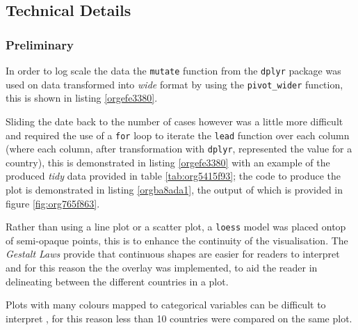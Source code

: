 \documentclass[11pt]{article}
\begin{document}
\subsection{Technical Details}
\label{sec:orgdeb17d1}
\subsubsection{Preliminary}
\label{sec:org9706ce9}
In order to log scale the data the \texttt{mutate} function from the \texttt{dplyr} package
was used on data transformed into \emph{wide} format by using the \texttt{pivot\_wider}
function, this is shown in listing \ref{orgefe3380}.

Sliding the date back to the number of cases however was a little more difficult
and required the use of a \texttt{for} loop to iterate the \texttt{lead} function over each
column (where each column, after transformation with \texttt{dplyr}, represented the
value for a country), this is demonstrated in listing \ref{orgefe3380} with an example of the
produced \emph{tidy} data provided in table \ref{tab:org5415f93}; the code to produce the plot is
demonstrated in listing \ref{orgba8ada1}, the output of which is provided in figure \ref{fig:org765f863}.

Rather than using a line plot or a scatter plot, a \texttt{loess} model was placed ontop of semi-opaque points, this is to enhance the continuity of the visualisation. The \emph{Gestalt Laws} provide that continuous shapes are easier for readers to interpret \cite{staudinger2011} and for this reason the the overlay was implemented, to aid the reader in delineating between the different countries in a plot.

Plots with many colours mapped to categorical variables can be difficult to interpret \cite{wilson2017,rost2018}, for this reason less than 10 countries were compared on the same plot.
\end{document}
